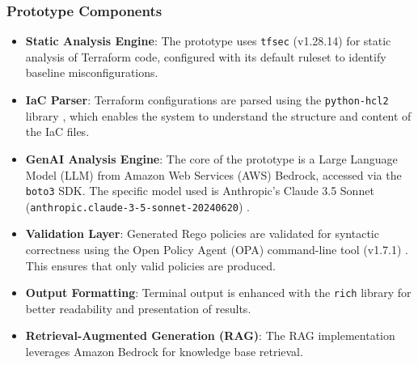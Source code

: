 \subsubsection*{Prototype Components}
\begin{itemize}
	\item \textbf{Static Analysis Engine}: The prototype uses \texttt{tfsec} (v1.28.14) \cite{aqua_security_tfsec_nodate} for static analysis of Terraform code, configured with its default ruleset to identify baseline misconfigurations.
	\item \textbf{IaC Parser}: Terraform configurations are parsed using the \texttt{python-hcl2} library \cite{amplify_python-hcl2_2025}, which enables the system to understand the structure and content of the IaC files.
	\item \textbf{GenAI Analysis Engine}: The core of the prototype is a Large Language Model (LLM) from Amazon Web Services (AWS) Bedrock, accessed via the \texttt{boto3} SDK. The specific model used is Anthropic's Claude 3.5 Sonnet (\texttt{anthropic.claude-3-5-sonnet-20240620}) \cite{anthropic_claude_2023}.
	\item \textbf{Validation Layer}: Generated Rego policies are validated for syntactic correctness using the Open Policy Agent (OPA) command-line tool (v1.7.1) \cite{the_opa_authors_open_nodate}. This ensures that only valid policies are produced.
	\item \textbf{Output Formatting}: Terminal output is enhanced with the \texttt{rich} library \cite{textualize_rich_nodate} for better readability and presentation of results.
	\item \textbf{Retrieval-Augmented Generation (RAG)}: The RAG implementation leverages Amazon Bedrock for knowledge base retrieval.
\end{itemize}

